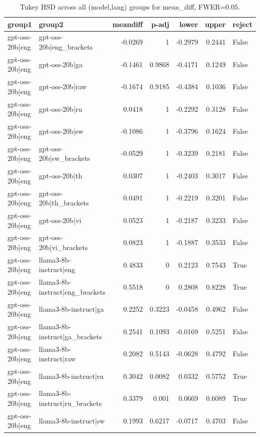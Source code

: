 \begin{table}
\caption{Tukey HSD across all (model,lang) groups for mean_diff, FWER=0.05.}
\label{tab:tukey_all_models_all_langs_mean_diff}
\begin{tabular}{l l r r r r l}
\toprule
group1 & group2 & meandiff & p-adj & lower & upper & reject \\
\midrule
gpt-oss-20b|eng & gpt-oss-20b|eng_brackets & -0.0269 & 1 & -0.2979 & 0.2441 & False \\
gpt-oss-20b|eng & gpt-oss-20b|ga & -0.1461 & 0.9868 & -0.4171 & 0.1249 & False \\
gpt-oss-20b|eng & gpt-oss-20b|raw & -0.1674 & 0.9185 & -0.4384 & 0.1036 & False \\
gpt-oss-20b|eng & gpt-oss-20b|ru & 0.0418 & 1 & -0.2292 & 0.3128 & False \\
gpt-oss-20b|eng & gpt-oss-20b|sw & -0.1086 & 1 & -0.3796 & 0.1624 & False \\
gpt-oss-20b|eng & gpt-oss-20b|sw_brackets & -0.0529 & 1 & -0.3239 & 0.2181 & False \\
gpt-oss-20b|eng & gpt-oss-20b|th & 0.0307 & 1 & -0.2403 & 0.3017 & False \\
gpt-oss-20b|eng & gpt-oss-20b|th_brackets & 0.0491 & 1 & -0.2219 & 0.3201 & False \\
gpt-oss-20b|eng & gpt-oss-20b|vi & 0.0523 & 1 & -0.2187 & 0.3233 & False \\
gpt-oss-20b|eng & gpt-oss-20b|vi_brackets & 0.0823 & 1 & -0.1887 & 0.3533 & False \\
gpt-oss-20b|eng & llama3-8b-instruct|eng & 0.4833 & 0 & 0.2123 & 0.7543 & True \\
gpt-oss-20b|eng & llama3-8b-instruct|eng_brackets & 0.5518 & 0 & 0.2808 & 0.8228 & True \\
gpt-oss-20b|eng & llama3-8b-instruct|ga & 0.2252 & 0.3223 & -0.0458 & 0.4962 & False \\
gpt-oss-20b|eng & llama3-8b-instruct|ga_brackets & 0.2541 & 0.1093 & -0.0169 & 0.5251 & False \\
gpt-oss-20b|eng & llama3-8b-instruct|raw & 0.2082 & 0.5143 & -0.0628 & 0.4792 & False \\
gpt-oss-20b|eng & llama3-8b-instruct|ru & 0.3042 & 0.0082 & 0.0332 & 0.5752 & True \\
gpt-oss-20b|eng & llama3-8b-instruct|ru_brackets & 0.3379 & 0.001 & 0.0669 & 0.6089 & True \\
gpt-oss-20b|eng & llama3-8b-instruct|sw & 0.1993 & 0.6217 & -0.0717 & 0.4703 & False \\

\end{tabular}
\end{table}
